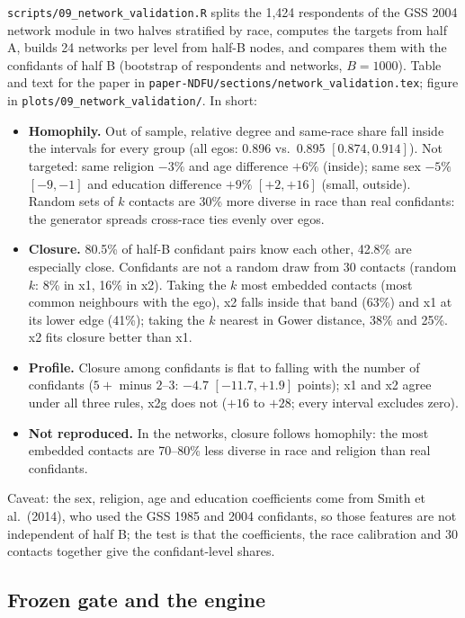 \documentclass[11pt,a4paper]{article}
\newcommand{\code}[1]{\texttt{#1}}
\begin{document}
\code{scripts/09\_network\_validation.R} splits the 1{,}424 respondents of the GSS 2004
network module in two halves stratified by race, computes the targets from half A, builds
24 networks per level from half-B nodes, and compares them with the confidants of half B
(bootstrap of respondents and networks, $B = 1000$). Table and text for the paper in
\code{paper-NDFU/sections/}\allowbreak\code{network\_validation.tex}; figure in
\code{plots/09\_network\_validation/}. In short:
\begin{itemize}
  \item \textbf{Homophily.} Out of sample, relative degree and same-race share fall inside
    the intervals for every group (all egos: 0.896 vs.\ 0.895 $[0.874, 0.914]$). Not
    targeted: same religion $-3\%$ and age difference $+6\%$ (inside); same sex $-5\%$
    $[-9, -1]$ and education difference $+9\%$ $[+2, +16]$ (small, outside). Random sets of
    $k$ contacts are 30\% more diverse in race than real confidants: the generator spreads
    cross-race ties evenly over egos.
  \item \textbf{Closure.} 80.5\% of half-B confidant pairs know each other, 42.8\% are
    especially close. Confidants are not a random draw from 30 contacts (random $k$: 8\%
    in x1, 16\% in x2). Taking the $k$ most embedded contacts (most common neighbours with
    the ego), x2 falls inside that band (63\%) and x1 at its lower edge (41\%); taking the
    $k$ nearest in Gower distance, 38\% and 25\%. x2 fits closure better than x1.
  \item \textbf{Profile.} Closure among confidants is flat to falling with the number of
    confidants ($5+$ minus $2$--$3$: $-4.7$ $[-11.7, +1.9]$ points); x1 and x2 agree under
    all three rules, x2g does not ($+16$ to $+28$; every interval excludes zero).
  \item \textbf{Not reproduced.} In the networks, closure follows homophily: the most
    embedded contacts are 70--80\% less diverse in race and religion than real confidants.
\end{itemize}
Caveat: the sex, religion, age and education coefficients come from Smith et al.\ (2014),
who used the GSS 1985 and 2004 confidants, so those features are not independent of
half B; the test is that the coefficients, the race calibration and 30 contacts together
give the confidant-level shares.

\subsection{Frozen gate and the engine}
\label{sec:frozengate}
\end{document}
